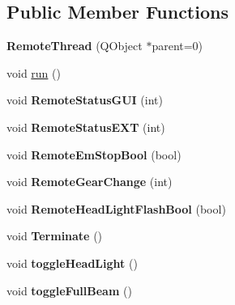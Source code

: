 \subsection*{Public Member Functions}
\begin{DoxyCompactItemize}
\item 
\hypertarget{class_remote_thread_a1acb4cb43462156d6b9177bcb1e1dfb1}{}{\bfseries Remote\+Thread} (Q\+Object $\ast$parent=0)\label{class_remote_thread_a1acb4cb43462156d6b9177bcb1e1dfb1}

\item 
void \hyperlink{class_remote_thread_afaaf517a8ecef88feeaa477ac84da127}{run} ()
\item 
\hypertarget{class_remote_thread_a8da88adbd10488157ce7c634fd150f3d}{}void {\bfseries Remote\+Status\+G\+U\+I} (int)\label{class_remote_thread_a8da88adbd10488157ce7c634fd150f3d}

\item 
\hypertarget{class_remote_thread_a7eb9019a150eba70aef59e978817ac36}{}void {\bfseries Remote\+Status\+E\+X\+T} (int)\label{class_remote_thread_a7eb9019a150eba70aef59e978817ac36}

\item 
\hypertarget{class_remote_thread_a2903df0c063123c45d22d97dd55f76fa}{}void {\bfseries Remote\+Em\+Stop\+Bool} (bool)\label{class_remote_thread_a2903df0c063123c45d22d97dd55f76fa}

\item 
\hypertarget{class_remote_thread_a4dc74280db042b990cbb960b7610fa89}{}void {\bfseries Remote\+Gear\+Change} (int)\label{class_remote_thread_a4dc74280db042b990cbb960b7610fa89}

\item 
\hypertarget{class_remote_thread_af124b02a085e979b77db074994c0495b}{}void {\bfseries Remote\+Head\+Light\+Flash\+Bool} (bool)\label{class_remote_thread_af124b02a085e979b77db074994c0495b}

\item 
\hypertarget{class_remote_thread_a230a67afa07fe8ded962803751ff0acb}{}void {\bfseries Terminate} ()\label{class_remote_thread_a230a67afa07fe8ded962803751ff0acb}

\item 
\hypertarget{class_remote_thread_ac2f9c11acf7383bc97c0643ff76ac195}{}void {\bfseries toggle\+Head\+Light} ()\label{class_remote_thread_ac2f9c11acf7383bc97c0643ff76ac195}

\item 
\hypertarget{class_remote_thread_aeae85c095bf0b265d907660af3f92abd}{}void {\bfseries toggle\+Full\+Beam} ()\label{class_remote_thread_aeae85c095bf0b265d907660af3f92abd}


\end{DoxyCompactItemize}
